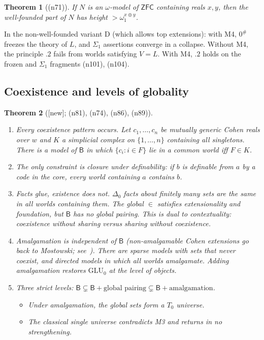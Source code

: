 \documentclass[11pt]{article}
\newtheorem{theorem}{Theorem}[section]
\theoremstyle{definition}
\theoremstyle{remark}
\newcommand{\B}{\mathsf{B}}
\newcommand{\ZFC}{\mathsf{ZFC}}
\newcommand{\GLU}{\mathrm{GLU}}
\newcommand{\status}[1]{\textsf{[#1]}}
\newcommand{\note}[1]{\textsf{(n#1)}}
\begin{document}
\begin{theorem}[\note{71}]
If $N$ is an $\omega$-model of $\ZFC$ containing reals $x,y$, then the well-founded part of $N$ has height $>\omega_1^{x\oplus y}$.
\end{theorem}

\noindent In the non-well-founded variant D (which allows top extensions): with M4, $0^\#$ freezes the theory of $L$, and $\Sigma_1$ assertions converge in a collapse. Without M4, the principle $.2$ fails from worlds satisfying $V=L$. With M4, $.2$ holds on the frozen and $\Sigma_1$ fragments \note{101}, \note{104}.

\subsection{Coexistence and levels of globality}

\begin{theorem}[\status{new}; \note{81}, \note{74}, \note{86}, \note{89}]\label{thm:coexist}
\leavevmode
\begin{enumerate}
\item \emph{Every coexistence pattern occurs.} Let $c_1,\dots,c_n$ be mutually generic Cohen reals over $w$ and $K$ a simplicial complex on $\{1,\dots,n\}$ containing all singletons. There is a model of $\B$ in which $\{c_i:i\in F\}$ lie in a common world iff $F\in K$.
\item \emph{The only constraint is closure under definability}: if $b$ is definable from $a$ by a code in the core, every world containing $a$ contains $b$.
\item \emph{Facts glue, existence does not.} $\Delta_0$ facts about finitely many sets are the same in all worlds containing them. The global $\in$ satisfies extensionality and foundation, but $\B$ has no global pairing. This is dual to contextuality: coexistence without sharing versus sharing without coexistence.
\item \emph{Amalgamation is independent of $\B$} (non-amalgamable Cohen extensions go back to Mostowski; see~\cite{HHKVW}). There are sparse models with sets that never coexist, and directed models in which all worlds amalgamate. Adding amalgamation restores $\GLU_0$ at the level of objects.
\item \emph{Three strict levels}: $\B\subsetneq\B+\text{global pairing}\subsetneq\B+\text{amalgamation}$.
  \begin{itemize}
  \item Under amalgamation, the global sets form a $T_0$ universe.
  \item The classical single universe contradicts M3 and returns in no strengthening.
  \end{itemize}
\end{enumerate}
\end{theorem}
\end{document}
